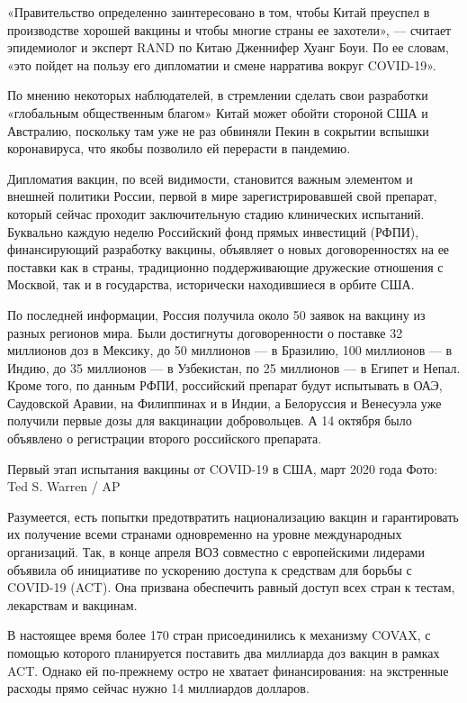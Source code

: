 «Правительство определенно заинтересовано в том, чтобы Китай преуспел в
производстве хорошей вакцины и чтобы многие страны ее захотели», --- считает
эпидемиолог и эксперт RAND по Китаю Дженнифер Хуанг Боуи. По ее словам, «это
пойдет на пользу его дипломатии и смене нарратива вокруг COVID-19».

По мнению некоторых наблюдателей, в стремлении сделать свои разработки
«глобальным общественным благом» Китай может обойти стороной США и Австралию,
поскольку там уже не раз обвиняли Пекин в сокрытии вспышки коронавируса, что
якобы позволило ей перерасти в пандемию.

Дипломатия вакцин, по всей видимости, становится важным элементом и внешней
политики России, первой в мире зарегистрировавшей свой препарат, который сейчас
проходит заключительную стадию клинических испытаний. Буквально каждую неделю
Российский фонд прямых инвестиций (РФПИ), финансирующий разработку вакцины,
объявляет о новых договоренностях на ее поставки как в страны, традиционно
поддерживающие дружеские отношения с Москвой, так и в государства, исторически
находившиеся в орбите США.

По последней информации, Россия получила около 50 заявок на вакцину из разных
регионов мира. Были достигнуты договоренности о поставке 32 миллионов доз в
Мексику, до 50 миллионов --- в Бразилию, 100 миллионов --- в Индию, до 35 миллионов
--- в Узбекистан, по 25 миллионов --- в Египет и Непал. Кроме того, по данным РФПИ,
российский препарат будут испытывать в ОАЭ, Саудовской Аравии, на Филиппинах и
в Индии, а Белоруссия и Венесуэла уже получили первые дозы для вакцинации
добровольцев. А 14 октября было объявлено о регистрации второго российского
препарата.

Первый этап испытания вакцины от COVID-19 в США, март 2020 года
Фото: Ted S. Warren / AP

Разумеется, есть попытки предотвратить национализацию вакцин и гарантировать их
получение всеми странами одновременно на уровне международных организаций. Так,
в конце апреля ВОЗ совместно с европейскими лидерами объявила об инициативе по
ускорению доступа к средствам для борьбы с COVID-19 (ACT). Она призвана
обеспечить равный доступ всех стран к тестам, лекарствам и вакцинам.

В настоящее время более 170 стран присоединились к механизму COVAX, с помощью
которого планируется поставить два миллиарда доз вакцин в рамках ACT. Однако ей
по-прежнему остро не хватает финансирования: на экстренные расходы прямо сейчас
нужно 14 миллиардов долларов.

